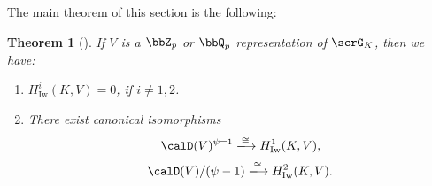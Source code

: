 \documentclass[a4paper,oneside]{amsart}
\let\opn\operatorname
\let\xlto\xlongrightarrow
\newcommand{\Iw}{\opn{Iw}}
\newtheorem{theorem}{Theorem}[section]
\numberwithin{equation}{section}
\begin{document}
The main theorem of this section is the following:
\begin{theorem}[{\cite[Th\'eor\`eme II.1.3, Remarque II.3.2]{cherbonnier_theorie_1999}}]\label{thm:15019}
    If $V$ is a $\bbZ_p$ or $\bbQ_p$ representation of $\scrG_K$, then we have:
    \begin{enumerate}
        \item $H^i_{\Iw}(K,V)=0$, if $i\neq 1,2$.
        \item There exist canonical isomorphisms
              \begin{equation}\label{eq:43260}
                  \calD(V)^{\psi=1}\xlto{\cong}H^1_{\Iw}(K,V),
              \end{equation}
              $$\calD(V)/(\psi-1)\xlto{\cong}H^2_{\Iw}(K,V).$$
    \end{enumerate}
\end{theorem}
\end{document}
